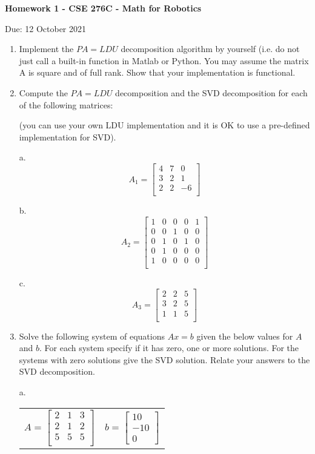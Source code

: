 \documentclass[12pt]{article}
\begin{document}
\centerline{\bf Homework 1 - CSE 276C - Math for Robotics}
\centerline{Due: 12 October 2021}

\begin{enumerate}
\item Implement the $PA = LDU$ decomposition algorithm by yourself
  (i.e. do not just call a built-in function in Matlab or Python. You
  may assume the matrix A is square and of full rank. Show that your
  implementation is functional.

\item Compute the $PA=LDU$ decomposition and the SVD decomposition for
  each of the following matrices:

  (you can use your own LDU implementation and it is OK to use a
  pre-defined implementation for SVD).

a. 
\[
A_1 = \left[\begin{array}{ccc} 4 & 7 & 0\\ 3 & 2 & 1 \\ 2 & 2 & -6\\ \end{array}\right]
\]

b. \[
A_2 = \left[\begin{array}{ccccc} 
              1 & 0 & 0 & 0 & 1\\ 
              0 & 0 & 1 & 0 & 0\\
              0 & 1 & 0 & 1 & 0\\ 
              0 & 1 & 0 & 0 & 0\\
              1 & 0 & 0 & 0 & 0\\ 
\end{array}\right]
\]

c. 
\[
A_3 = \left[\begin{array}{ccc} 2 & 2 & 5\\ 3 & 2 & 5 \\ 1 & 1 & 5\\ \end{array}\right]
\]

\item Solve the following system of equations $Ax = b$ given the below
  values for $A$ and $b$. For each system specify if it has zero, one
  or more solutions. For the systems with zero solutions give the SVD
  solution. Relate your answers to the SVD decomposition.

  a. 
  \begin{center}
    \begin{tabular}{cc}
      $
      A = \left[\begin{array}{ccc}
                  2 & 1 & 3 \\
                  2 & 1 & 2 \\
                  5 & 5 & 5\\
                \end{array}\right]
      $ &
      $ 
          b = \left[\begin{array}{c} 10 \\ -10 \\ 0 \end{array}\right]
      $
    \end{tabular}
  \end{center}


\end{enumerate}
\end{document}
